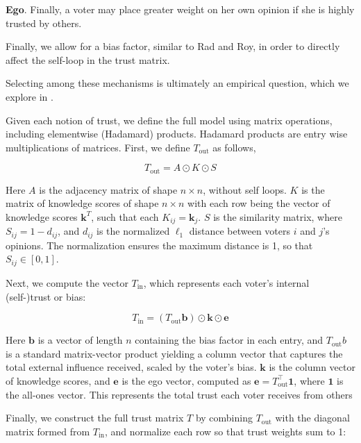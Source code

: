 \textbf{Ego}. Finally, a voter may place greater weight on her own opinion if
she is highly trusted by others.

Finally, we allow for a bias factor, similar to Rad and Roy, in order to
directly affect the self-loop in the trust matrix.

Selecting among these mechanisms is ultimately an empirical question, which we explore in .

Given each notion of trust, we define the full model using matrix operations,
including elementwise (Hadamard) products. Hadamard products are entry wise
multiplications of matrices. First, we define $T_{\text{out}}$ as follows,

\begin{equation}
	T_{\text{out}} = A \odot  K \odot S
	\label{eq:mat_out_trust}
\end{equation}

Here $A$ is the adjacency matrix of shape $n \times n$, without self loops. $K$
is the matrix of knowledge scores of shape $n \times n$ with each row being
the vector of knowledge scores $\boldsymbol{k}^T$, such that each $K_{ij} =
	\boldsymbol{k}_j$. $S$ is the similarity matrix, where $S_{ij} = 1 - d_{ij}$,
and $d_{ij}$ is the normalized $\ell_1$ distance between voters $i$ and $j$’s
opinions. The normalization ensures the maximum distance is 1, so that $S_{ij}
	\in [0, 1]$.

Next, we compute the vector $T_{\text{in}}$, which represents each voter’s internal (self-)trust or bias:

\begin{equation}
	T_{\text{in}} = (T_{\text{out}} \boldsymbol{b}) \odot \boldsymbol{k} \odot \boldsymbol{e}
	\label{eq:in_trust}
\end{equation}

Here $\boldsymbol{b}$ is a vector of length $n$ containing the bias factor in each entry,
and $T_{\text{out}} b$ is a standard matrix-vector product yielding a column
vector that captures the total external influence received, scaled by the
voter's bias. $\boldsymbol{k}$ is the column vector of knowledge scores, and
$\boldsymbol{e}$ is the ego vector, computed as $\boldsymbol{e} = T_{\text{out}}^\top
	\boldsymbol{1}$, where $\boldsymbol{1}$ is the all-ones vector. This represents
the total trust each voter receives from others


Finally, we construct the full trust matrix $T$ by combining $T_{\text{out}}$ with the diagonal matrix formed from $T_{\text{in}}$, and normalize each row so that trust weights sum to 1:



